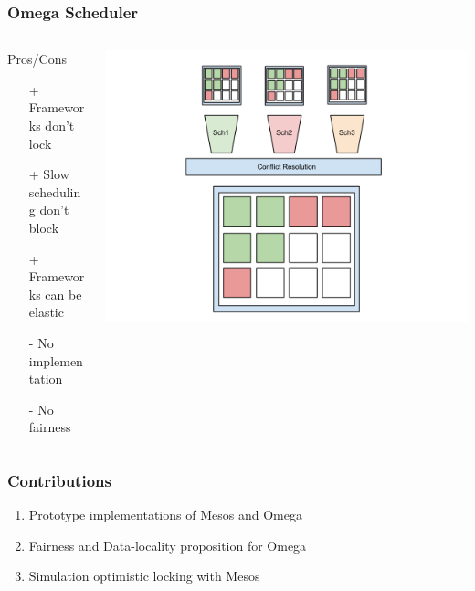 \documentclass[notes=hide]{beamer}
\begin{document}
  \note{}


  \begin{frame}
    \frametitle{Omega Scheduler}
       \begin{columns}[T]
       \begin{column}{.5\textwidth}
        \begin{block}{Pros/Cons}
            \begin{itemize}
              \item[+] Frameworks don't lock
              \item[+] Slow scheduling don't block
              \item[+] Frameworks can be elastic 
              \item[-] No implementation 
              \item[-] No fairness 
            \end{itemize}
         \end{block}
       \end{column}
       \begin{column}{.6\textwidth}
         \includegraphics[trim = 50mm 0mm 0mm 0mm,clip,scale=0.30,natwidth=960,natheight=720]{Omega.png}
       \end{column}
       \end{columns}
  \end{frame}

  \note{}

  \begin{frame}
    \frametitle{Contributions}
    \begin{enumerate}
        \item Prototype implementations of Mesos and Omega
        \item Fairness and Data-locality proposition for Omega
        \item Simulation optimistic locking with Mesos 
    \end{enumerate}
  \end{frame}
\end{document}
